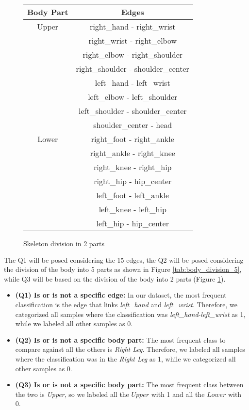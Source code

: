 \begin{figure}[H]
    \centering
    \renewcommand{\arraystretch}{0.85}
    \begin{tabular}{|c|c|}
        \hline
        \textbf{Body Part} & \textbf{Edges} \\
        \hline
        Upper & right\_hand - right\_wrist \\
        & right\_wrist - right\_elbow \\
        & right\_elbow - right\_shoulder \\
        & right\_shoulder - shoulder\_center \\
        & left\_hand - left\_wrist \\
        & left\_elbow - left\_shoulder \\
        & left\_shoulder - shoulder\_center \\
        & shoulder\_center - head \\
        \hline
        Lower & right\_foot - right\_ankle \\
        & right\_ankle - right\_knee \\
        & right\_knee - right\_hip \\
        & right\_hip - hip\_center \\
        & left\_foot - left\_ankle \\
        & left\_knee - left\_hip \\
        & left\_hip - hip\_center \\
        \hline
    \end{tabular}
    \caption{Skeleton division in 2 parts}
    \label{tab:top_bottom}
\end{figure}    

The Q1 will be posed considering the 15 edges, the Q2 will be posed considering the division of the body into 5 parts as shown in Figure \ref{tab:body_division_5}, while Q3 will be based on the division of the body into 2 parts (Figure \ref{tab:top_bottom}).


\begin{itemize}

    \item \textbf{(Q1) Is or is not a specific edge:} In our dataset, the most frequent classification is the edge that links \textit{left\_hand} and \textit{left\_wrist}. 
    Therefore, we categorized all samples where the classification was \textit{left\_hand}-\textit{left\_wrist} as 1, while we labeled all other samples as 0.   
    
    \item \textbf{(Q2) Is or is not a specific body part:} The most frequent class to compare against all the others is \textit{Right Leg}.
    Therefore, we labeled all samples where the classification was in the \textit{Right Leg} as 1, while we categorized all other samples as 0.

    \item \textbf{(Q3) Is or is not a specific body part:} The most frequent class between the two is \textit{Upper}, so we labeled all the $Upper$ with 1 and all the $Lower$ with 0.
    
   
\end{itemize}

